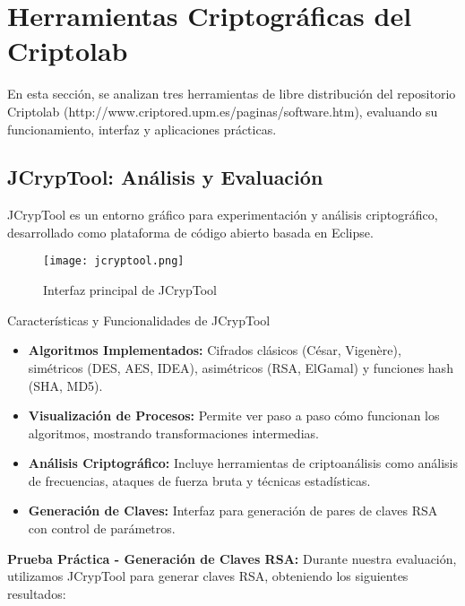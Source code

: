 \section{Herramientas Criptográficas del Criptolab}

En esta sección, se analizan tres herramientas de libre distribución del repositorio Criptolab (http://www.criptored.upm.es/paginas/software.htm), evaluando su funcionamiento, interfaz y aplicaciones prácticas.

\subsection{JCrypTool: Análisis y Evaluación}

JCrypTool es un entorno gráfico para experimentación y análisis criptográfico, desarrollado como plataforma de código abierto basada en Eclipse.

\begin{figure}[ht]
	\centering
	\texttt{[image: jcryptool.png]}
	\caption{Interfaz principal de JCrypTool}
	\label{fig:jcryptool}
\end{figure}

\begin{cryptomethod}{Características y Funcionalidades de JCrypTool}
	\begin{itemize}
		\item \textbf{Algoritmos Implementados:} Cifrados clásicos (César, Vigenère), simétricos (DES, AES, IDEA), asimétricos (RSA, ElGamal) y funciones hash (SHA, MD5).

		\item \textbf{Visualización de Procesos:} Permite ver paso a paso cómo funcionan los algoritmos, mostrando transformaciones intermedias.

		\item \textbf{Análisis Criptográfico:} Incluye herramientas de criptoanálisis como análisis de frecuencias, ataques de fuerza bruta y técnicas estadísticas.

		\item \textbf{Generación de Claves:} Interfaz para generación de pares de claves RSA con control de parámetros.
	\end{itemize}
\end{cryptomethod}

\textbf{Prueba Práctica - Generación de Claves RSA:}
Durante nuestra evaluación, utilizamos JCrypTool para generar claves RSA, obteniendo los siguientes resultados:

